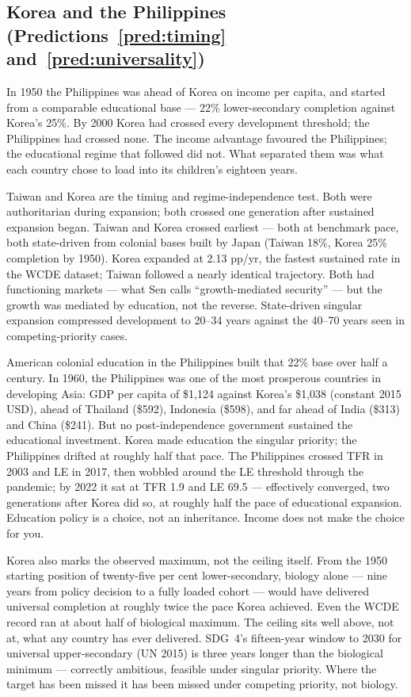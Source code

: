 \documentclass[12pt,letterpaper]{article}
\begin{document}
\subsection{Korea and the Philippines (Predictions~\ref{pred:timing} and~\ref{pred:universality})}\label{korea-and-philippines}

In 1950 the Philippines was ahead of Korea on income per capita, and started from a comparable educational base --- 22\% lower-secondary completion against Korea's 25\%. By 2000 Korea had crossed every development threshold; the Philippines had crossed none. The income advantage favoured the Philippines; the educational regime that followed did not. What separated them was what each country chose to load into its children's eighteen years.

Taiwan and Korea are the timing and regime-independence test. Both
were authoritarian during expansion; both crossed one generation after
sustained expansion began. Taiwan and Korea crossed earliest --- both
at benchmark pace, both state-driven from colonial bases built by
Japan (Taiwan 18\%, Korea 25\% completion by 1950). Korea expanded at 2.13 pp/yr, the fastest sustained
rate in the WCDE dataset; Taiwan followed a nearly identical trajectory.
Both had functioning markets --- what Sen calls ``growth-mediated
security'' --- but the growth was mediated by education, not the reverse.
State-driven singular expansion compressed development to 20--34 years
against the 40--70 years seen in competing-priority cases.

American colonial education in the
Philippines built that 22\% base over half a century. In 1960, the Philippines was one of the
most prosperous countries in developing Asia: GDP per capita of \$1,124
against Korea's \$1,038 (constant 2015 USD), ahead of Thailand (\$592),
Indonesia (\$598), and far ahead of India (\$313) and China (\$241). But
no post-independence government sustained the educational investment.
Korea made education the singular priority;
the Philippines drifted at roughly half that pace. The Philippines crossed TFR in 2003 and LE in 2017, then wobbled around the LE threshold through the pandemic; by 2022 it sat at TFR 1.9 and LE 69.5 --- effectively converged, two generations after Korea did so, at roughly half the pace of educational expansion. Education policy is a choice, not an inheritance. Income does not make the choice for you.

Korea also marks the observed maximum, not the ceiling itself. From the 1950 starting position of
twenty-five per cent lower-secondary, biology alone --- nine years from
policy decision to a fully loaded cohort --- would have delivered
universal completion at roughly twice the pace Korea achieved. Even
the WCDE record ran at about half of biological maximum. The ceiling sits well above,
not at, what any country has ever delivered. SDG~4's fifteen-year
window to 2030 for universal upper-secondary (UN 2015) is three
years longer than the biological minimum --- correctly ambitious,
feasible under singular priority. Where the target has been
missed it has been missed under competing priority, not biology.
\end{document}
